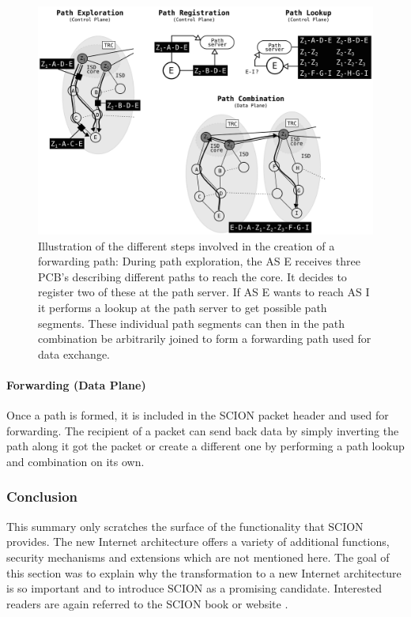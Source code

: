 \begin{figure}
	\begin{center}
		\def\svgwidth{1\textwidth}
		\includegraphics[scale=0.24]{../illustrations/importantConcepts/SCIONPathCreation.pdf} 
		\caption[Caption for the list of figures.]{Illustration of the different steps involved in the creation of a forwarding path: During path exploration, the AS E receives three PCB's describing different paths to reach the core. It decides to register two of these at the path server. If AS E wants to reach AS I it performs a lookup at the path server to get possible path segments. These individual path segments can then in the path combination be arbitrarily joined to form a forwarding path used for data exchange.}
		\label{fig:SCIONCreationForwardingPath}
	\end{center}
\end{figure}

\paragraph{Forwarding (Data Plane)}

Once a path is formed, it is included in the SCION packet header and used for forwarding. The recipient of a packet can send back data by simply inverting the path along it got the packet or create a different one by performing a path lookup and combination on its own.

\subsubsection{Conclusion}

This summary only scratches the surface of the functionality that SCION provides. The new Internet architecture offers a variety of additional functions, security mechanisms and extensions which are not mentioned here. The goal of this section was to explain why the transformation to a new Internet architecture is so important and to introduce SCION as a promising candidate. Interested readers are again referred to the SCION book \cite{SCIONBook} or website \cite{SCIONWebMain}.